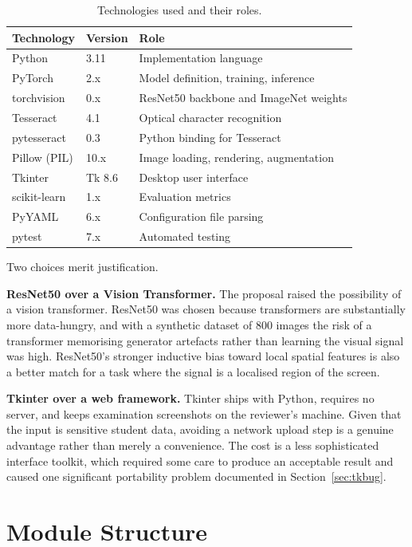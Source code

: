 \documentclass[12pt,oneside]{report}
\begin{document}
\begin{table}[h]
\centering
\caption{Technologies used and their roles.}
\begin{tabular}{@{}lll@{}}
\toprule
\textbf{Technology} & \textbf{Version} & \textbf{Role} \\
\midrule
Python & 3.11 & Implementation language \\
PyTorch & 2.x & Model definition, training, inference \\
torchvision & 0.x & ResNet50 backbone and ImageNet weights \\
Tesseract & 4.1 & Optical character recognition \\
pytesseract & 0.3 & Python binding for Tesseract \\
Pillow (PIL) & 10.x & Image loading, rendering, augmentation \\
Tkinter & Tk 8.6 & Desktop user interface \\
scikit-learn & 1.x & Evaluation metrics \\
PyYAML & 6.x & Configuration file parsing \\
pytest & 7.x & Automated testing \\
\bottomrule
\end{tabular}
\end{table}

Two choices merit justification.

\textbf{ResNet50 over a Vision Transformer.} The proposal raised the
possibility of a vision transformer. ResNet50 was chosen because transformers
are substantially more data-hungry, and with a synthetic dataset of 800 images
the risk of a transformer memorising generator artefacts rather than learning
the visual signal was high. ResNet50's stronger inductive bias toward local
spatial features is also a better match for a task where the signal is a
localised region of the screen.

\textbf{Tkinter over a web framework.} Tkinter ships with Python, requires no
server, and keeps examination screenshots on the reviewer's machine. Given that
the input is sensitive student data, avoiding a network upload step is a
genuine advantage rather than merely a convenience. The cost is a less
sophisticated interface toolkit, which required some care to produce an
acceptable result and caused one significant portability problem documented in
Section~\ref{sec:tkbug}.

\section{Module Structure}
\label{sec:modules}
\end{document}
